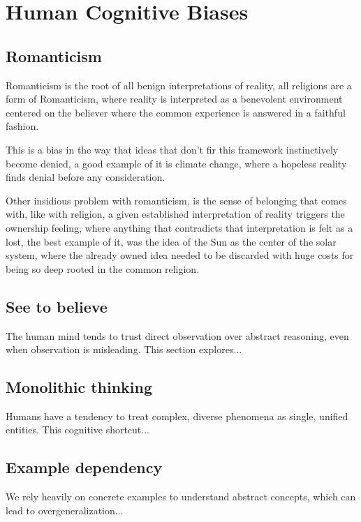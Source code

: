 
\chapter{Human Cognitive Biases}

\section{Romanticism}

Romanticism is the root of all benign interpretations of reality, all religions are a form
of Romanticism, where reality is interpreted as a benevolent environment centered on the
believer where the common experience is answered in a faithful fashion.

This is a bias in the way that ideas that don't fir this framework instinctively become denied,
a good example of it is climate change, where a hopeless reality finds denial before any
consideration.

Other insidious problem with romanticism, is the sense of belonging that comes with, like
with religion, a given established interpretation of reality triggers the ownership feeling,
where anything that contradicts that interpretation is felt as a lost, the best example of it,
was the idea of the Sun as the center of the solar system, where the already owned idea needed
to be discarded with huge costs for being so deep rooted in the common religion.

\section{See to believe}

The human mind tends to trust direct observation over abstract reasoning, 
even when observation is misleading. This section explores...


\section{Monolithic thinking}

Humans have a tendency to treat complex, diverse phenomena as single, 
unified entities. This cognitive shortcut...

\section{Example dependency}

We rely heavily on concrete examples to understand abstract concepts, 
which can lead to overgeneralization...
